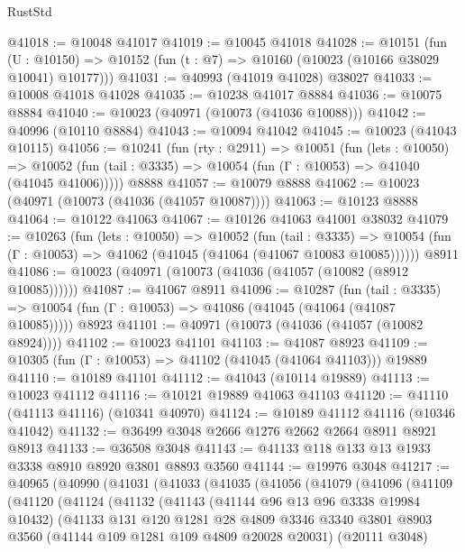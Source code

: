 \begin{lexlean}{RustStd}
\begin{coremodule}
@41018 := @10048 @41017
@41019 := @10045 @41018
@41028 := @10151
    (fun (U : @10150) => @10152 (fun (t : @7) => @10160 (@10023 (@10166 @38029 @10041) @10177)))
@41031 := @40993 (@41019 @41028) @38027
@41033 := @10008 @41018 @41028
@41035 := @10238 @41017 @8884
@41036 := @10075 @8884
@41040 := @10023 (@40971 (@10073 (@41036 @10088)))
@41042 := @40996 (@10110 @8884)
@41043 := @10094 @41042
@41045 := @10023 (@41043 @10115)
@41056 := @10241
    (fun (rty : @2911) =>
    @10051
      (fun (lets : @10050) =>
      @10052 (fun (tail : @3335) => @10054 (fun (Γ : @10053) => @41040 (@41045 @41006)))))
    @8888
@41057 := @10079 @8888
@41062 := @10023 (@40971 (@10073 (@41036 (@41057 @10087))))
@41063 := @10123 @8888
@41064 := @10122 @41063
@41067 := @10126 @41063 @41001 @38032
@41079 := @10263
    (fun (lets : @10050) =>
    @10052
      (fun (tail : @3335) =>
      @10054 (fun (Γ : @10053) => @41062 (@41045 (@41064 (@41067 @10083 @10085))))))
    @8911
@41086 := @10023 (@40971 (@10073 (@41036 (@41057 (@10082 (@8912 @10085))))))
@41087 := @41067 @8911
@41096 := @10287
    (fun (tail : @3335) => @10054 (fun (Γ : @10053) => @41086 (@41045 (@41064 (@41087 @10085)))))
    @8923
@41101 := @40971 (@10073 (@41036 (@41057 (@10082 @8924))))
@41102 := @10023 @41101
@41103 := @41087 @8923
@41109 := @10305 (fun (Γ : @10053) => @41102 (@41045 (@41064 @41103))) @19889
@41110 := @10189 @41101
@41112 := @41043 (@10114 @19889)
@41113 := @10023 @41112
@41116 := @10121 @19889 @41063 @41103
@41120 := @41110 (@41113 @41116) (@10341 @40970)
@41124 := @10189 @41112 @41116 (@10346 @41042)
@41132 := @36499 @3048 @2666 @1276 @2662 @2664 @8911 @8921 @8913
@41133 := @36508 @3048
@41143 := @41133 @118 @133 @13 @1933 @3338 @8910 @8920 @3801 @8893 @3560
@41144 := @19976 @3048
@41217 := @40965
    (@40990
      (@41031
        (@41033
          (@41035
            (@41056
              (@41079
                (@41096
                  (@41109
                    (@41120
                      (@41124
                        (@41132
                          (@41143
                            (@41144 @96 @13 @96 @3338 @19984 @10432)
                            (@41133
                              @131
                              @120
                              @1281
                              @28
                              @4809
                              @3346
                              @3340
                              @3801
                              @8903
                              @3560
                              (@41144 @109 @1281 @109 @4809 @20028 @20031)
                              (@20111 @3048)

\end{coremodule}
\end{lexlean}
